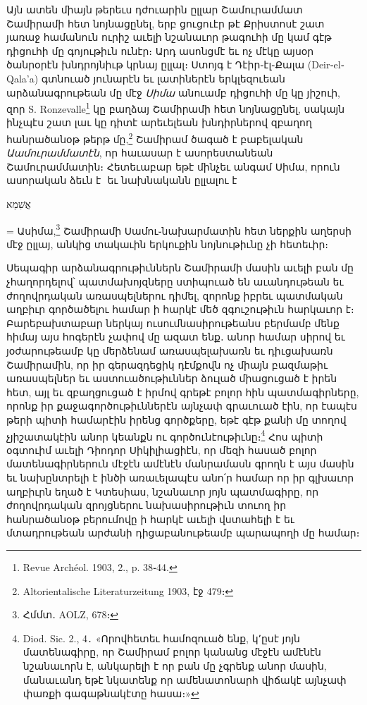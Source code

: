 \documentclass{article}
\newcommand*\svgAAAA{}
\begin{document}
{Այն ատեն միայն թերեւս դժուարին ըլլար Շամուրամմատ Շամիրամի հետ նոյնացընել, երբ ցուցուէր թէ Քրիստոսէ շատ յառաջ համանուն ուրիշ աւելի նշանաւոր թագուհի մը կամ գէթ դիցուհի մը գոյութիւն ունէր։ Արդ ասոնցմէ եւ ոչ մէկը այսօր ծանրօրէն խնդրոյնիւթ կրնայ ըլլալ։ Ստոյգ է Դէիր֊էլ֊Քալա (Deir֊el֊Qala'a) գտնուած յունարէն եւ լատիներէն երկլեզուեան արձանագրութեան մը մէջ \emph{Սիմա} անուամբ դիցուհի մը կը յիշուի, զոր S. Ronzevalle\footnote{Revue Archéol. 1903, 2., p. 38֊44.} կը բաղձայ Շամիրամի հետ նոյնացընել, սակայն ինչպէս շատ լաւ կը դիտէ արեւելեան խնդիրներով զբաղող հանրածանօթ թերթ մը,\footnote{Altorientalische Literaturzeitung 1903, էջ 479։} Շամիրամ ծագած է բաբելական \emph{Աամուրամմատէն}, որ հաւասար է ասորեստանեան Շամուրամմատին։ Հետեւաբար եթէ մինչեւ անգամ Սիմա, որուն ասորական ձեւն է $\svgAAAA$ եւ նախնականն ըլլալու է \begin{hebrewfont}אֲשִׁמַא\end{hebrewfont} = Ասիմա,\footnote{Հմմտ․ AOLZ, 678։} Շամիրամի Սամու֊նախարմատին հետ ներքին աղերսի մէջ ըլլայ, անկից տակաւին երկուքին նոյնութիւնը չի հետեւիր։

Սեպագիր արձանագրութիւններն Շամիրամի մասին աւելի բան մը չհաղորդելով՝ պատմախոյզները ստիպուած են աւանդութեան եւ ժողովրդական առասպելներու դիմել, զորոնք իբրեւ պատմական աղբիւր գործածելու համար ի հարկէ մեծ զգուշութիւն հարկաւոր է։ Բարեբախտաբար ներկայ ուսումնասիրութեանս բերմամբ մենք հիմայ այս հոգերէն չափով մը ազատ ենք․ անոր համար սիրով եւ յօժարութեամբ կը մերձենամ առասպելախառն եւ դիւցախառն Շամիրամին, որ իր գերազդեցիկ դէմքովն ոչ միայն բազմաթիւ առասպելներ եւ աստուածութիւններ ձուլած միացուցած է իրեն հետ, այլ եւ զբաղցուցած է իրմով գրեթէ բոլոր հին պատմագիրները, որոնք իր քաջագործութիւններէն այնչափ գրաւուած էին, որ էապէս թերի պիտի համարէին իրենց գործքերը, եթէ գէթ քանի մը տողով չյիշատակէին անոր կեանքն ու գործունէութիւնը։\footnote{Diod. Sic. 2., 4․ «Որովհետեւ համոզուած ենք, կ՚ըսէ յոյն մատենագիրը, որ Շամիրամ բոլոր կանանց մէջէն ամէնէն նշանաւորն է, անկարելի է որ բան մը չգրենք անոր մասին, մանաւանդ եթէ նկատենք որ ամենատոնարհ վիճակէ այնչափ փառքի գագաթնակէտը հասա։»} Հոս պիտի օգտուիմ աւելի Դիոդոր Սիկիլիացիէն, որ մեզի հասած բոլոր մատենագիրներուն մէջէն ամէնէն մանրամասն գրողն է այս մասին եւ նախընտրելի է ինծի առաւելապէս անո՛ր համար որ իր գլխաւոր աղբիւրն եղած է Կտեսիաս, նշանաւոր յոյն պատմագիրը, որ ժողովրդական զրոյցներու նախասիրութիւն տուող իր հանրածանօթ բերումովը ի հարկէ աւելի վստահելի է եւ մտադրութեան արժանի դիցաբանութեամբ պարապողի մը համար։

}
\end{document}
